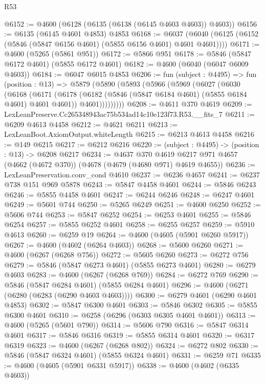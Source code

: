\begin{lexlean}{R53}
\begin{coremodule}
@6152 := @4600 (@6128 (@6135 (@6138 (@6145 @4603 @4603)) @4603))
@6156 := @6135 (@6145 @4601 @4853) @4853
@6168 := @6037 (@6040 (@6125 (@6152 (@5846 (@5847 @6156 @4601) (@5855 @6156 @4601) @4601 @4601))))
@6171 := @4600 (@5265 (@5861 @951))
@6172 := @5866 @951
@6178 := @5846 (@5847 @6172 @4601) (@5855 @6172 @4601)
@6182 := @4600 (@6040 (@6047 @6009 @4603))
@6184 := @6047 @6015 @4853
@6206 := fun (subject : @4495) =>
  fun (position : @13) =>
  @5879
    (@5890
      (@5893
        (@5966
          (@5969
            (@6027
              (@6030
                (@6168
                  (@6171
                    (@6178
                      (@6182 (@5846 (@5847 @6184 @4601) (@5855 @6184 @4601) @4601 @4601))
                      @4601)))))))))
@6208 := @4611 @370 @4619
@6209 := LexLeanPreserve.Cc265348943ac75b534ad14c10e123f73.R53.__fits_7
@6211 := @6209 @4613 @4458
@6212 := @4621 @6211
@6213 := LexLeanBoot.AxiomOutput.whiteLength
@6215 := @6213 @4613 @4458
@6216 := @149 @6215
@6217 := @6212 @6216
@6220 := (subject : @4495) -> (position : @13) -> @6208 @6217
@6234 := @4637
    @370
    @4619
    @6217
    @971
    @4657
    (@4662 (@4672 @370))
    (@4678 (@4679 (@4680 @971) @4619 @4655))
@6236 := LexLeanPreservation.conv_cond @4610
@6237 := @6236 @4657
@6241 := @6237 @738 @151 @969 @5878
@6243 := @5847 @4458 @4601
@6244 := @5846 @6243
@6246 := @5855 @4458 @4601
@6247 := @6244 @6246
@6248 := @6247 @4601
@6249 := @5601 @744
@6250 := @5265 @6249
@6251 := @4600 @6250
@6252 := @5606 @744
@6253 := @5847 @6252
@6254 := @6253 @4601
@6255 := @5846 @6254
@6257 := @5855 @6252 @4601
@6258 := @6255 @6257
@6259 := @5910 @4613
@6260 := @6259 @19
@6264 := @4600 (@4605 (@5901 @6260 @5917))
@6267 := @4600 (@4602 (@6264 @4603))
@6268 := @5600 @6260
@6271 := @4600 (@6267 (@6268 @756))
@6272 := @5605 @6260
@6273 := @6272 @756
@6279 := @5846 (@5847 @6273 @4601) (@5855 @6273 @4601)
@6280 := @6279 @4603
@6283 := @4600 (@6267 (@6268 @769))
@6284 := @6272 @769
@6290 := @5846 (@5847 @6284 @4601) (@5855 @6284 @4601)
@6296 := @4600 (@6271 (@6280 (@6283 (@6290 @4603 @4603))))
@6300 := @6279 @4601 (@6290 @4601 @4853)
@6302 := @5847 @6300 @4601
@6303 := @5846 @6302
@6305 := @5855 @6300 @4601
@6310 := @6258 (@6296 (@6303 @6305 @4601 @4601))
@6313 := @4600 (@5265 (@5601 @790))
@6314 := @5606 @790
@6316 := @5847 @6314 @4601
@6317 := @5846 @6316
@6319 := @5855 @6314 @4601
@6320 := @6317 @6319
@6323 := @4600 (@6267 (@6268 @802))
@6324 := @6272 @802
@6330 := @5846 (@5847 @6324 @4601) (@5855 @6324 @4601)
@6331 := @6259 @71
@6335 := @4600 (@4605 (@5901 @6331 @5917))
@6338 := @4600 (@4602 (@6335 @4603))

\end{coremodule}
\end{lexlean}
